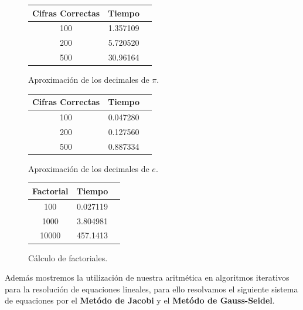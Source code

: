 \documentclass[a4paper,10pt,twocolumn]{article}
\begin{document}
	\begin{figure}[h!]%
		\begin{center}
			\begin{tabular}{|c|c|c|} \hline
			 	Cifras Correctas & Tiempo 	\\ \hline
			    100              &  1.357109 \\ \hline  
			    200              &  5.720520  \\ \hline
				500              &  30.96164  \\ \hline

\end{tabular}
		\caption{Aproximación de los decimales de $\pi$. \label{fig:ex}}
		\end{center}
	\end{figure}
	
	\begin{figure}[h!]%
		\begin{center}
			\begin{tabular}{|c|c|c|} \hline
			 	Cifras Correctas & Tiempo 	\\ \hline
			    100              &  0.047280 \\ \hline  
			    200              &  0.127560  \\ \hline
				500              &  0.887334  \\ \hline

\end{tabular}
		\caption{Aproximación de los decimales de $e$. \label{fig:ex}}
		\end{center}
	\end{figure}
	
	\begin{figure}[h!]%
		\begin{center}
			\begin{tabular}{|c|c|c|} \hline
			 	Factorial & Tiempo 	\\ \hline
			    100              &  0.027119 \\ \hline  
			    1000             &  3.804981  \\ \hline
				10000            &  457.1413  \\ \hline
		
\end{tabular}
		\caption{Cálculo de factoriales. \label{fig:ex}}
		\end{center}
	\end{figure}
	
	Además mostremos la utilización de nuestra aritmética en algoritmos iterativos para la resolución de equaciones lineales, para ello resolvamos el siguiente sistema de equaciones por el \textbf{Metódo de Jacobi} y el \textbf{Metódo de Gauss-Seidel}.
	
\end{document}
